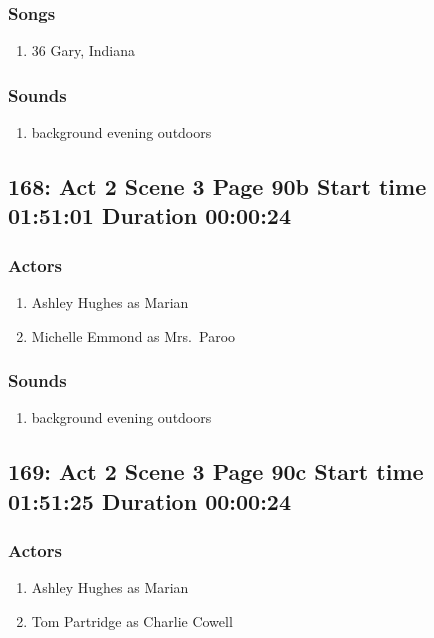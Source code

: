 \subsubsection{Songs}
\begin{enumerate}
\item 36 Gary, Indiana
\end{enumerate}\subsubsection{Sounds}
\begin{enumerate}
\item background evening outdoors
\end{enumerate}
\subsection{168: Act 2 Scene 3 Page 90b Start time 01:51:01 Duration 00:00:24}

\subsubsection{Actors}
\begin{enumerate}
\item Ashley Hughes as Marian
\item Michelle Emmond as Mrs.~Paroo
\end{enumerate}

\subsubsection{Sounds}
\begin{enumerate}
\item background evening outdoors
\end{enumerate}
\subsection{169: Act 2 Scene 3 Page 90c Start time 01:51:25 Duration 00:00:24}

\subsubsection{Actors}
\begin{enumerate}
\item Ashley Hughes as Marian
\item Tom Partridge as Charlie Cowell
\end{enumerate}

